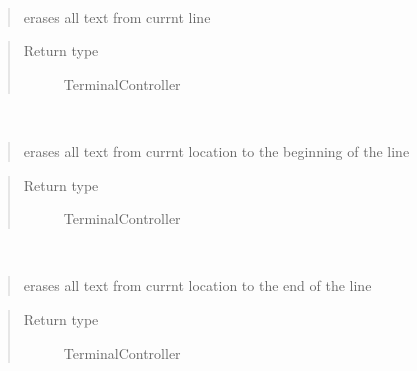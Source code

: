 \documentclass[a4paper,10pt,english]{sphinxmanual}
\begin{document}
\begin{fulllineitems}

\begin{fulllineitems}
\label{\detokenize{api/termtools.terminal.TerminalController:termtools.terminal.TerminalController.eraseLine}}~\begin{quote}

erases all text from currnt line
\end{quote}
\begin{quote}\begin{description}
\item[{Return type}] \leavevmode
TerminalController

\end{description}\end{quote}

\end{fulllineitems}


\begin{fulllineitems}
\label{\detokenize{api/termtools.terminal.TerminalController:termtools.terminal.TerminalController.eraseToBOL}}~\begin{quote}

erases all text from currnt location to the beginning of the line
\end{quote}
\begin{quote}\begin{description}
\item[{Return type}] \leavevmode
TerminalController

\end{description}\end{quote}

\end{fulllineitems}


\begin{fulllineitems}
\label{\detokenize{api/termtools.terminal.TerminalController:termtools.terminal.TerminalController.eraseToEOL}}~\begin{quote}

erases all text from currnt location to the end of the line
\end{quote}
\begin{quote}\begin{description}
\item[{Return type}] \leavevmode
TerminalController


\end{description}
\end{quote}
\end{fulllineitems}
\end{fulllineitems}
\end{document}
